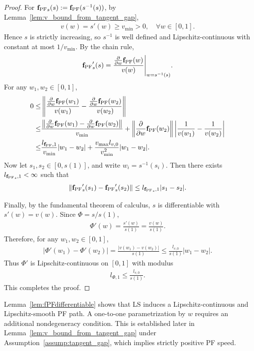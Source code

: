 \documentclass{article}
\newcommand{\fPF}{{\mathbf{f}_{\rm PF}}}
\newcommand{\Farc}{\Phi}
\begin{document}
\begin{proof}
For ${\fPF}_s(s):=\fPF(s^{-1}(s))$, by Lemma~\ref{lem:v_bound_from_tangent_gap},
\begin{align}
v(w)=s'(w)\ge v_{\min}>0,
\quad
\forall w\in[0,1].
\end{align}
Hence $s$ is strictly increasing, so $s^{-1}$ is well defined and Lipschitz-continuous with constant at most $1/v_{\min}$. By the chain rule,
\begin{align}
{\fPF}_s'(s)
=
\frac{\frac{\partial}{\partial w}\fPF(w)}{v(w)}
\Bigg|_{w=s^{-1}(s)}.
\end{align}
For any $w_1,w_2\in[0,1]$,
\begin{align}
0 \le &\left\| \frac{\frac{\partial}{\partial w}\fPF(w_1)}{v(w_1)} - \frac{\frac{\partial}{\partial w}\fPF(w_2)}{v(w_2)} \right\| \nonumber\\
\leq & \frac{ \left\| \frac{\partial}{\partial w}\fPF(w_1) - \frac{\partial}{\partial w}\fPF(w_2) \right\| }{v_{\min}} + \left\| \frac{\partial}{\partial w}\fPF(w_2) \right\| \left| \frac{1}{v(w_1)}-\frac{1}{v(w_2)} \right| \nonumber\\
\leq & \frac{l_{\fPF,1}}{v_{\min}}|w_1-w_2| + \frac{v_{\max}l_{v,0}}{v_{\min}^2}|w_1-w_2|.
\end{align}
Now let $s_1,s_2\in[0,s(1)]$, and write $w_i=s^{-1}(s_i)$. Then there exists
$l_{{\fPF}_s,1}<\infty$ such that
\begin{align}
\|{\fPF}_s'(s_1)-{\fPF}_s'(s_2)\|
\le
l_{{\fPF}_s,1}|s_1-s_2|.
\end{align}

Finally, by the fundamental theorem of calculus, $s$ is differentiable with $s'(w)=v(w)$. Since $\Farc=s/s(1)$,
\begin{align}
\Farc'(w)=\frac{s'(w)}{s(1)}=\frac{v(w)}{s(1)}.
\end{align}
Therefore, for any $w_1,w_2\in[0,1]$,
\begin{align}
|\Farc'(w_1)-\Farc'(w_2)|
=
\frac{|v(w_1)-v(w_2)|}{s(1)}
\le
\frac{l_{v,0}}{s(1)}|w_1-w_2|.
\end{align}
Thus $\Farc'$ is Lipschitz-continuous on $[0,1]$ with modulus
\begin{align}
l_{\Farc,1}\le \frac{l_{v,0}}{s(1)}.
\end{align}
This completes the proof.
\end{proof}

Lemma~\ref{lem:fPFdifferentiable} shows that LS induces a Lipschitz-continuous and Lipschitz-smooth PF path.
A one-to-one parametrization by $w$ requires an additional nondegeneracy condition. This is established later in Lemma~\ref{lem:v_bound_from_tangent_gap} under Assumption~\ref{assump:tangent_gap}, which implies strictly positive PF speed.
\end{document}
